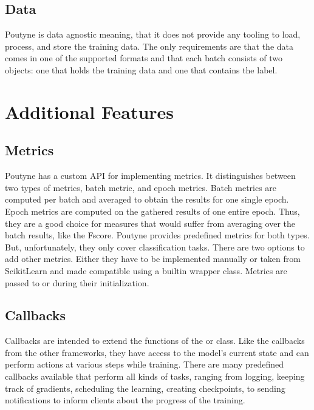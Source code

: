 \documentclass[letterpaper,10pt,english]{jupyterBook}
\begin{document}
\subsection{Data}
\label{\detokenize{Poutyne:data}}
\sphinxAtStartPar
Poutyne is data agnostic meaning, that it does not provide any tooling to load, process, and store the training data.
The only requirements are that the data comes in one of the supported formats and that each batch consists of two objects: one that holds the training data and one that contains the label.


\section{Additional Features}
\label{\detokenize{Poutyne:additional-features}}

\subsection{Metrics}
\label{\detokenize{Poutyne:metrics}}
\sphinxAtStartPar
Poutyne has a custom API for implementing metrics.
It distinguishes between two types of metrics, batch metric, and epoch metrics.
Batch metrics are computed per batch and averaged to obtain the results for one single epoch.
Epoch metrics are computed on the gathered results of one entire epoch. Thus, they are a good choice for measures that would suffer from averaging over the batch results, like the F\sphinxhyphen{}score.
Poutyne provides predefined metrics for both types. But, unfortunately, they only cover classification tasks.
There are two options to add other metrics. Either they have to be implemented manually or taken from Scikit\sphinxhyphen{}Learn and made compatible using a built\sphinxhyphen{}in wrapper class.
Metrics are passed to  or  during their initialization.


\subsection{Callbacks}
\label{\detokenize{Poutyne:callbacks}}
\sphinxAtStartPar
Callbacks are intended to extend the functions of the  or  class. Like the callbacks from the other frameworks, they have access to the model’s current state and can perform actions at various steps while training.
There are many predefined callbacks available that perform all kinds of tasks, ranging from logging, keeping track of gradients, scheduling the learning, creating checkpoints, to sending notifications to inform clients about the progress of the training.
\end{document}
